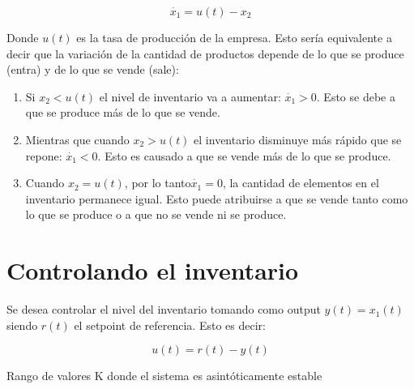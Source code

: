 \documentclass{sig-alternate}
\begin{document}
\begin{equation}
\dot{x_{1}}=u(t)-x_{2}\label{eq:dotx1}\end{equation}


Donde $u(t)$ es la tasa de producción de la empresa. Esto sería equivalente
a decir que la variación de la cantidad de productos depende de lo
que se produce (entra) y de lo que se vende (sale):
\begin{enumerate}
\item Si $x_{2}<u(t)$ el nivel de inventario va a aumentar: $\dot{x_{1}}>0$.
Esto se debe a que se produce más de lo que se vende.
\item Mientras que cuando $x_{2}>u(t)$ el inventario disminuye más rápido
que se repone: $\dot{x_{1}}<0$. Esto es causado a que se vende más
de lo que se produce.
\item Cuando $x_{2}=u(t)$, por lo tanto$\dot{x_{1}}=0$, la cantidad de
elementos en el inventario permanece igual. Esto puede atribuirse
a que se vende tanto como lo que se produce o a que no se vende ni
se produce.
\end{enumerate}

\section{Controlando el inventario}

Se desea controlar el nivel del inventario tomando como output $y(t)=x_{1}(t)$
siendo $r(t)$ el setpoint de referencia. Esto es decir:

\begin{equation}
u(t)=r(t)-y(t)\end{equation}


Rango de valores K donde el sistema es asintóticamente estable


\nocite{*}

\end{document}
